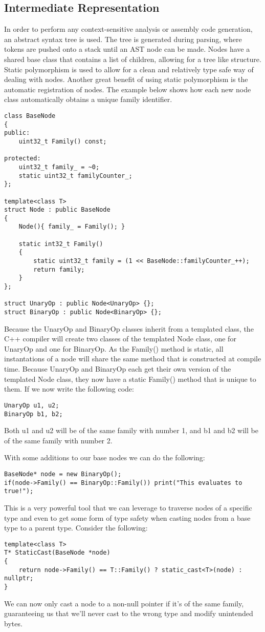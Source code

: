 \documentclass[12pt]{article}
\begin{document}
\subsection{Intermediate Representation}

In order to perform any context-sensitive analysis or assembly code generation, an abstract syntax tree is used. The tree is generated during parsing, where tokens are pushed onto a stack until an AST node can be made. Nodes have a shared base class that contains a list of children, allowing for a tree like structure. Static polymorphism is used to allow for a clean and relatively type safe way of dealing with nodes. Another great benefit of using static polymorphism is the automatic registration of nodes. The example below shows how each new node class automatically obtains a unique family identifier.

\begin{lstlisting}
class BaseNode
{
public:
	uint32_t Family() const;

protected:
	uint32_t family_ = ~0;
	static uint32_t familyCounter_;
};

template<class T>
struct Node : public BaseNode
{
	Node(){ family_ = Family(); }

	static int32_t Family()
	{
		static uint32_t family = (1 << BaseNode::familyCounter_++);
		return family;
	}
};

struct UnaryOp : public Node<UnaryOp> {};
struct BinaryOp : public Node<BinaryOp> {};
\end{lstlisting}
Because the UnaryOp and BinaryOp classes inherit from a templated class, the C++ compiler will create two classes of the templated Node class, one for UnaryOp and one for BinaryOp. As the Family() method is static, all instantations of a node will share the same method that is constructed at compile time. Because UnaryOp and BinaryOp each get their own version of the templated Node class, they now have a static Family() method that is unique to them. If we now write the following code:
\begin{lstlisting}
UnaryOp u1, u2;
BinaryOp b1, b2;
\end{lstlisting}
Both u1 and u2 will be of the same family with number 1, and b1 and b2 will be of the same family with number 2.

With some additions to our base nodes we can do the following:
\begin{lstlisting}
BaseNode* node = new BinaryOp();
if(node->Family() == BinaryOp::Family()) print("This evaluates to true!");
\end{lstlisting}
This is a very powerful tool that we can leverage to traverse nodes of a specific type and even to get some form of type safety when casting nodes from a base type to a parent type. Consider the following:
\begin{lstlisting}
template<class T>
T* StaticCast(BaseNode *node)
{
	return node->Family() == T::Family() ? static_cast<T>(node) : nullptr;
}
\end{lstlisting}
We can now only cast a node to a non-null pointer if it's of the same family, guaranteeing us that we'll never cast to the wrong type and modify unintended bytes.
\end{document}
